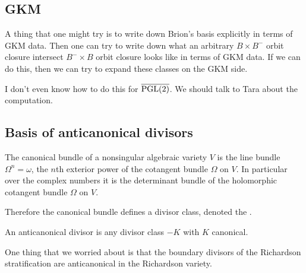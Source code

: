 \documentclass[12pt]{article}
\begin{document}
\subsection{GKM}
A thing that one might try is to write down Brion's basis explicitly in terms of GKM data.
Then one can try to write down what an arbitrary $B\times B^-$ orbit closure intersect $B^-\times B$ orbit closure
looks like in terms of GKM data. If we can do this, then we can try to expand these classes 
on the GKM side.

\hfill

I don't even know how to do this for $\overline{\operatorname{PGL}(2)}$. We should talk to Tara about the computation.

\subsection{Basis of anticanonical divisors}
The canonical bundle of a nonsingular algebraic variety $V$ 
is the line bundle $\Omega^n = \omega$, the $n$th exterior power of the cotangent bundle $\Omega$ on $V$.
In particular over the complex numbers it is the determinant bundle of the holomorphic cotangent
bundle $\Omega$ on $V$. 

\hfill

Therefore the canonical bundle defines a divisor class, denoted the .

\begin{definition}
    An anticanonical divisor is any divisor class $-K$ with $K$ canonical.
\end{definition}

\hfill

One thing that we worried about is that the boundary divisors of the Richardson stratification
are anticanonical in the Richardson variety. 
\end{document}
